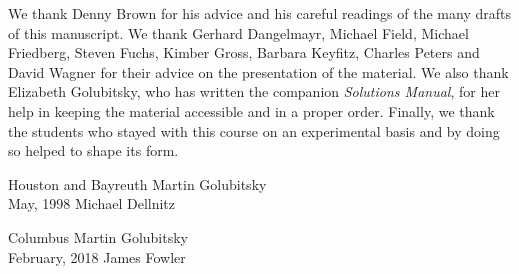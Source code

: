 \documentclass{ximera}
\begin{document}
We thank Denny Brown for his advice and his careful readings of the
many drafts of this manuscript.  We thank Gerhard Dangelmayr, Michael
Field, Michael Friedberg, Steven Fuchs, Kimber Gross, Barbara Keyfitz,
Charles Peters and David Wagner for their advice on the presentation
of the material.  We also thank Elizabeth Golubitsky, who has written
the companion {\em Solutions Manual\/}, for her help in keeping the
material accessible and in a proper order.  Finally, we thank the
students who stayed with this course on an experimental basis and by
doing so helped to shape its form.

\vspace{0.1in}

\noindent Houston and Bayreuth \hfill Martin Golubitsky \\
May, 1998  \hfill Michael Dellnitz




Columbus \hfill Martin Golubitsky  \\
February, 2018 \hfill James Fowler
\end{document}
